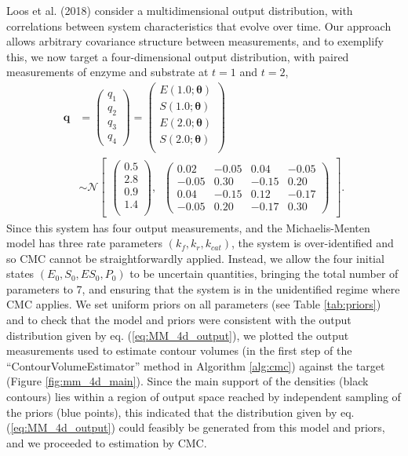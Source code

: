 Loos et al. (2018) consider a multidimensional output distribution, with correlations between system characteristics that evolve over time. Our approach allows arbitrary covariance structure between measurements, and to exemplify this, we now target a four-dimensional output distribution, with paired measurements of enzyme and substrate at $t=1$ and $t=2$,
%
\begin{equation}\label{eq:MM_4d_output}
\begin{aligned}
\boldsymbol{q} &= \begin{pmatrix} q_1 \\ q_2 \\ q_3 \\ q_4 \end{pmatrix} =
\begin{pmatrix}
E(1.0; \boldsymbol{\theta})\\
S(1.0; \boldsymbol{\theta})\\
E(2.0; \boldsymbol{\theta})\\
S(2.0; \boldsymbol{\theta})\\
\end{pmatrix}
\\
&\sim  \mathcal{N}
\begin{bmatrix}
\begin{pmatrix}
0.5\\
2.8\\
0.9\\
1.4\\
\end{pmatrix}, \;\;
\begin{pmatrix}
0.02 &  -0.05 &  0.04 & -0.05\\
-0.05 & 0.30  & -0.15 & 0.20\\
0.04 & -0.15  & 0.12  &  -0.17\\
-0.05 & 0.20 & -0.17 & 0.30
\end{pmatrix}
\end{bmatrix}.
\end{aligned}
\end{equation}
%
Since this system has four output measurements, and the Michaelis-Menten model has three rate parameters $(k_f,k_r,k_{cat})$, the system is over-identified and so CMC cannot be straightforwardly applied. Instead, we allow the four initial states $(E_0, S_0, ES_0, P_0)$ to be uncertain quantities, bringing the total number of parameters to 7, and ensuring that the system is in the unidentified regime where CMC applies. We set uniform priors on all parameters (see Table \ref{tab:priors}) and to check that the model and priors were consistent with the output distribution given by eq. (\ref{eq:MM_4d_output}), we plotted the output measurements used to estimate contour volumes (in the first step of the ``ContourVolumeEstimator'' method in Algorithm \ref{alg:cmc}) against the target (Figure \ref{fig:mm_4d_main}). Since the main support of the densities (black contours) lies within a region of output space reached by independent sampling of the priors (blue points), this indicated that the distribution given by eq. (\ref{eq:MM_4d_output}) could feasibly be generated from this model and priors, and we proceeded to estimation by CMC.

